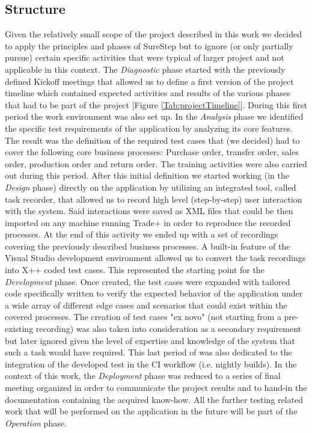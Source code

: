 \subsection{Structure}

Given the relatively small scope of the project described in this work we decided to apply the principles and phases of SureStep but to ignore (or only partially pursue) certain specific activities that were typical of larger project and not applicable in this context. 
The \textit{Diagnostic} phase started with the previously defined Kickoff meetings that allowed us to define a first version of the project timeline which contained expected activities and results of the various phases that had to be part of the project [Figure \ref{Tab:projectTimeline}].  During this first period the work environment was also set up. 
In the \textit{Analysis} phase we identified the specific test requirements of the application by analyzing its core features. The result was the definition of the required test cases that (we decided) had to cover the following core business processes: Purchase order, transfer order, sales order, production order and return order. The training activities were also carried out during this period. 
After this initial definition we started working (in the \textit{Design} phase) directly on the application by utilizing an integrated tool, called task recorder, that allowed us to record high level (step-by-step) user interaction with the system. Said interactions were saved as XML files that could be then imported on any machine running Trade+ in order to reproduce the recorded processes. At the end of this activity we ended up with a set of recordings covering the previously described business processes. 
A built-in feature of the Visual Studio development environment allowed us to convert the task recordings into X++ coded test cases. This represented the starting point for the \textit{Development} phase. Once created, the test cases were expanded with tailored code specifically written to verify the expected behavior of the application under a wide array of different edge cases and scenarios that could exist within the covered processes. The creation of test cases "ex novo" (not starting from a pre-existing recording) was also taken into consideration as a secondary requirement but later ignored given the level of expertise and knowledge of the system that such a task would have required. This last period of was also dedicated to the integration of the developed test in the CI workflow (i.e. nightly builds). 
In the context of this work, the \textit{Deployment} phase was reduced to a series of final meeting organized in order to communicate the project results and to hand-in the documentation containing the acquired know-how. 
All the further testing related work that will be performed on the application in the future will be part of the \textit{Operation} phase.

